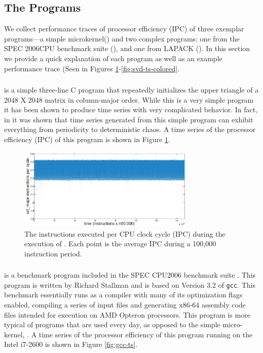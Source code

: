 \subsection{The Programs}
We collect performance traces of processor efficiency (IPC) of three exemplar programs---a simple microkernel(\col) and two complex programs: one from the
SPEC 2006CPU benchmark suite (\gcc), and one from LAPACK (\svd). In this section we provide a quick explanation of each program as well as an example performance trace (Seen in Figures \ref{fig:col-ts}-\ref{fig:svd-ts-colored}.
\subsubsection{\col}
\col is a simple three-line C program that repeatedly initializes the upper triangle of a  2048 X 2048 matrix in column-major order. While this is a very simple program it has been shown to produce time series with very complicated behavior. In fact, in \cite{mytkowicz09} it was shown that time series generated from this simple program can exhibit everything from periodicity to deterministic chaos.  A time series of the processor efficiency (IPC) of this program is shown in Figure \ref{fig:col-ts}.

\begin{figure}[htbp]
  \centering
    \includegraphics[width=0.75\textwidth]{figs/colFullTS}
    \caption{The instructions executed per CPU clock cycle (IPC) during the execution of \col. Each point is the average IPC during a 100,000 instruction period.}
    \label{fig:col-ts}
  
  \end{figure}

\subsubsection{\gcc}

\gcc is a benchmark program included in the SPEC CPU2006 benchmark suite \cite{spec}. This program is written by Richard Stallman and is based on Version 3.2 of {\tt gcc}. This benchmark essentially runs as a compiler with many of its optimization flags enabled, compiling a series of input files and generating x86-64 assembly code files intended for execution on AMD Opteron processors\cite{spec}. This program is more typical of programs that are used every day, as opposed to the simple micro-kernel, \col. A time series of the processor efficiency of this program running on the Intel i7-2600 is shown in Figure \ref{fig:gcc-ts}.

